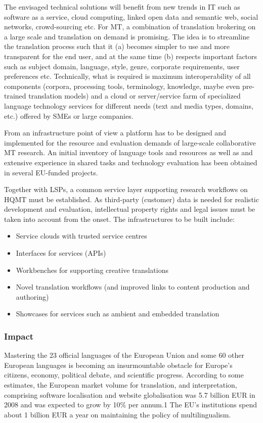 \documentclass[10pt, plain]{../../metanetpaper}
\begin{document}
\begin{multicols}{2}
The envisaged technical solutions will benefit from new trends in IT such as software as a service, cloud computing, linked open data and semantic web, social networks, crowd-sourcing etc. For MT, a combination of translation brokering on a large scale and translation on demand is promising. The idea is to streamline the translation process such that it (a) becomes simpler to use and more transparent for the end user, and at the same time (b) respects important factors such as subject domain, language, style, genre, corporate requirements, user preferences etc. Technically, what is required is maximum interoperability of all components (corpora, processing tools, terminology, knowledge, maybe even pre-trained translation models) and a cloud or server/service farm of specialized language technology services for different needs (text and media types, domains, etc.) offered by SMEs or large companies.
 
From an infrastructure point of view a platform has to be designed and implemented for the resource and evaluation demands of large-scale collaborative MT research. An initial inventory of language tools and resources as well as and extensive experience in shared tasks and technology evaluation has been obtained in several EU-funded projects.
 
Together with LSPs, a common service layer supporting research workflows on HQMT must be established. As third-party (customer) data is needed for realistic development and evaluation, intellectual property rights and legal issues must be taken into account from the onset. The infrastructures to be built include:

\begin{itemize}
\item Service clouds with trusted service centres
\item Interfaces for services (APIs)
\item Workbenches for supporting creative translations
\item Novel translation workflows (and improved links to content production and authoring)
\item Showcases for services such as ambient and embedded translation
\end{itemize}

\subsubsection{Impact}
\label{sec:impact-pt1}

Mastering the 23 official languages of the European Union and some 60 other European languages is becoming an insurmountable obstacle for Europe’s citizens, economy, political debate, and scientific progress. According to some estimates, the European market volume for translation, and interpretation, comprising software localisation and website globalisation was 5.7 billion EUR in 2008 and was expected to grow by 10\% per annum.1 The EU’s institutions spend about 1 billion EUR a year on maintaining the policy of multilingualism.
 

\end{multicols}
\end{document}
